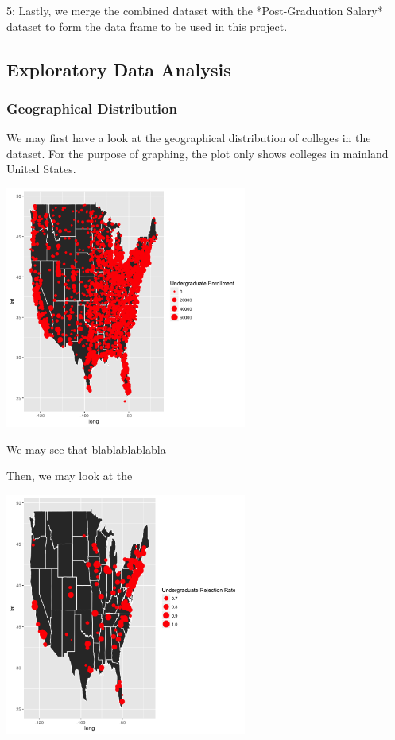 \documentclass{article}\usepackage[]{graphicx}\usepackage[]{color}
\newenvironment{knitrout}{}{} %
\begin{document}
5: Lastly, we merge the combined dataset with the *Post-Graduation Salary* dataset to form the data frame to be used in this project. 

\subsection{Exploratory Data Analysis}

\subsubsection{Geographical Distribution}
We may first have a look at the geographical distribution of colleges in the dataset. For the purpose of graphing, the plot only shows colleges in mainland United States.

\begin{knitrout}
\color{fgcolor}

{\centering \includegraphics[width=300px]{../../images/ggplot-schoolDistribution} 

}



\end{knitrout}

We may see that blablablablabla


Then, we may look at the 
\begin{knitrout}
\color{fgcolor}

{\centering \includegraphics[width=300px]{../../images/ggplot-admissionRateDistribution} 

}



\end{knitrout}
\end{document}

